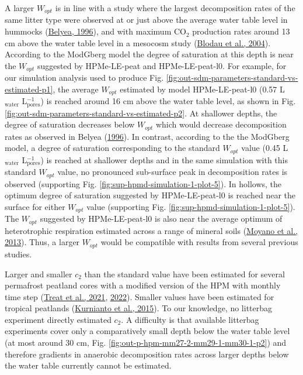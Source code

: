 \documentclass[
  12pt,
]{article}
\begin{document}
A larger \(W_{opt}\) is in line with a study where the largest decomposition rates of the same litter type were observed at or just above the average water table level in hummocks (\protect\hyperlink{ref-Belyea.1996}{Belyea, 1996}), and with maximum CO\(_2\) production rates around 13 cm above the water table level in a mesocosm study (\protect\hyperlink{ref-Blodau.2004}{Blodau et al., 2004}). According to the ModGberg model the degree of saturation at this depth is near the \(W_{opt}\) suggested by HPMe-LE-peat and HPMe-LE-peat-l0. For example, for our simulation analysis used to produce Fig. \ref{fig:out-sdm-parameters-standard-vs-estimated-p1}, the average \(W_{opt}\) estimated by model HPMe-LE-peat-l0 (0.57 L\(_\text{water}\) L\(_\text{pores}^{-1}\)) is reached around 16 cm above the water table level, as shown in Fig. \ref{fig:out-sdm-parameters-standard-vs-estimated-p2}. At shallower depths, the degree of saturation decreases below \(W_{opt}\) which would decrease decomposition rates as observed in Belyea (\protect\hyperlink{ref-Belyea.1996}{1996}). In contrast, according to the the ModGberg model, a degree of saturation corresponding to the standard \(W_{opt}\) value (0.45 L\(_\text{water}\) L\(_\text{pores}^{-1}\)) is reached at shallower depths and in the same simulation with this standard \(W_{opt}\) value, no pronounced sub-surface peak in decomposition rates is observed (supporting Fig. \ref{fig:sup-hpmd-simulation-1-plot-5}). In hollows, the optimum degree of saturation suggested by HPMe-LE-peat-l0 is reached near the surface for either \(W_{opt}\) value (supporting Fig. \ref{fig:sup-hpmd-simulation-1-plot-5}). The \(W_{opt}\) suggested by HPMe-LE-peat-l0 is also near the average optimum of heterotrophic respiration estimated across a range of mineral soils (\protect\hyperlink{ref-Moyano.2013}{Moyano et al., 2013}). Thus, a larger \(W_{opt}\) would be compatible with results from several previous studies.

Larger and smaller \(c_2\) than the standard value have been estimated for several permafrost peatland cores with a modified version of the HPM with monthly time step (\protect\hyperlink{ref-Treat.2021}{Treat et al., 2021}, \protect\hyperlink{ref-Treat.2022}{2022}). Smaller values have been estimated for tropical peatlands (\protect\hyperlink{ref-Kurnianto.2015}{Kurnianto et al., 2015}). To our knowledge, no litterbag experiment directly estimated \(c_2\). A difficulty is that available litterbag experiments cover only a comparatively small depth below the water table level (at most around 30 cm, Fig. \ref{fig:out-p-hpm-mm27-2-mm29-1-mm30-1-p2}) and therefore gradients in anaerobic decomposition rates across larger depths below the water table currently cannot be estimated.
\end{document}
